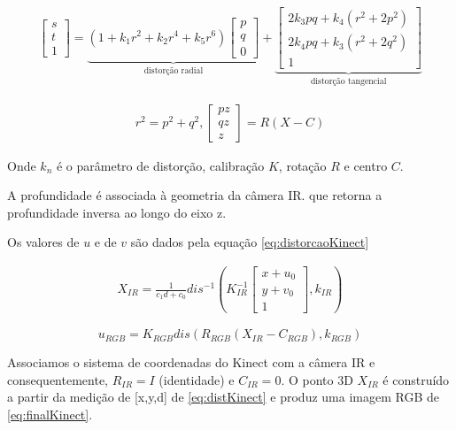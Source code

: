 \begin{gather} 
\begin{bmatrix}
s\\
t\\
1
\end{bmatrix} 
= 
\underbrace{(1 + k_1r^2 + k_2r^4 + k_5r^6) 
\begin{bmatrix}
p\\
q\\
0
\end{bmatrix} }_{\text{distorção radial}} 
+
\underbrace{
\begin{bmatrix}
2k_3pq+k_4(r^2+2p^2)\\
2k_4pq+k_3(r^2+2q^2)\\
1
\end{bmatrix} }_{\text{distorção tangencial}}
\label{eq:distorcaoKinect}
\end{gather}

\begin{gather}
r^2 = p^2+q^2, 
\begin{bmatrix}
pz\\ 
qz\\ 
z
\end{bmatrix} = R(X-C)
\label{eq:relacaoKinect}
\end{gather}



Onde $k_n$ é o parâmetro de distorção, calibração $K$, rotação $R$ e centro $C$.

A profundidade é associada à geometria da câmera IR. que retorna a profundidade inversa ao longo do eixo z.

Os valores de $u$ e de $v$ são dados pela equação \ref{eq:distorcaoKinect} %

\begin{gather} 
X_{IR} = \frac{1}{c_1 d + c_0}dis^{-1}\left ( K^{-1}_{IR}
\begin{bmatrix}
x+u_0\\ 
y+v_0\\ 
1
\end{bmatrix},k_{IR} 
\right )
\label{eq:distKinect}
\end{gather}

\begin{equation}
\label{eq:finalKinect}
u_{RGB} = K_{RGB} dis(R_{RGB}(X_{IR} - C_{RGB}),k_{RGB})
\end{equation}

Associamos o sistema de coordenadas do Kinect com a câmera IR e consequentemente, $R_{IR} = I$ (identidade) e $C_{IR} = 0$. 
O ponto 3D $X_{IR}$ é construído a partir da medição de [x,y,d] de \ref{eq:distKinect} e produz uma imagem RGB de \ref{eq:finalKinect}.

